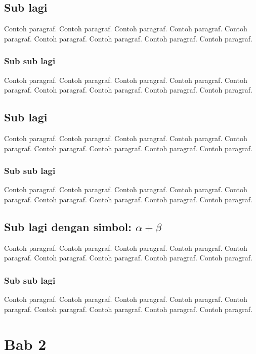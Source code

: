 \documentclass[twoside,bahasa]{tufte-book}
\begin{document}
\section{Sub lagi}

Contoh paragraf. Contoh paragraf. Contoh paragraf. Contoh paragraf.
Contoh paragraf. Contoh paragraf. Contoh paragraf. Contoh paragraf.
Contoh paragraf.

\subsection{Sub sub lagi}

Contoh paragraf. Contoh paragraf. Contoh paragraf. Contoh paragraf.
Contoh paragraf. Contoh paragraf. Contoh paragraf. Contoh paragraf.
Contoh paragraf.

\section{Sub lagi}

Contoh paragraf. Contoh paragraf. Contoh paragraf. Contoh paragraf.
Contoh paragraf. Contoh paragraf. Contoh paragraf. Contoh paragraf.
Contoh paragraf.

\subsection{Sub sub lagi}

Contoh paragraf. Contoh paragraf. Contoh paragraf. Contoh paragraf.
Contoh paragraf. Contoh paragraf. Contoh paragraf. Contoh paragraf.
Contoh paragraf.

\section{Sub lagi dengan simbol: $\alpha + \beta$}

Contoh paragraf. Contoh paragraf. Contoh paragraf. Contoh paragraf.
Contoh paragraf. Contoh paragraf. Contoh paragraf. Contoh paragraf.
Contoh paragraf.

\subsection{Sub sub lagi}

Contoh paragraf. Contoh paragraf. Contoh paragraf. Contoh paragraf.
Contoh paragraf. Contoh paragraf. Contoh paragraf. Contoh paragraf.
Contoh paragraf.



\chapter{Bab 2}
\end{document}
